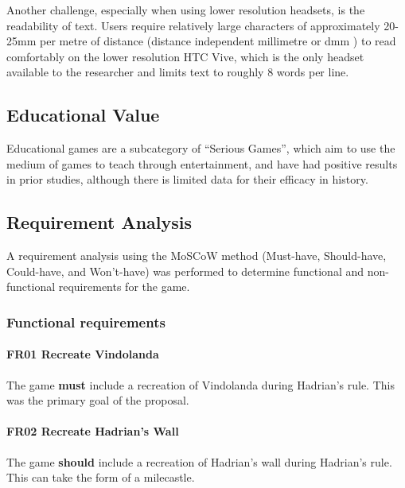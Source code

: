 \documentclass[sigconf,authordraft]{acmart}
\begin{document}
\label{sec:text_scale}
Another challenge, especially when using lower resolution headsets, is the
readability of text. Users require relatively large characters of approximately
20-25mm per metre of distance (distance independent millimetre or dmm
\cite{google_for_developers_designing_2017}) to read comfortably on the lower
resolution HTC Vive, \cite{solum_readability_2019} which is the only headset
available to the researcher and limits text to roughly 8 words per line.


\subsection{Educational Value}
Educational games are a subcategory of ``Serious Games'', which aim to use the
medium of games to teach through entertainment, and have had positive results in
prior studies, although there is limited data for their efficacy in history.
\cite{backlund_educational_2013}

\subsection{Requirement Analysis}

A requirement analysis using the MoSCoW method (Must-have, Should-have,
Could-have, and Won't-have) was performed to determine functional and
non-functional requirements for the game.

\subsubsection{Functional requirements}

\paragraph{FR01 Recreate Vindolanda}
The game \textbf{must} include a recreation of Vindolanda during Hadrian's
rule. This was the primary goal of the proposal.

\paragraph{FR02 Recreate Hadrian's Wall}
The game \textbf{should} include a recreation of Hadrian's wall during Hadrian's
rule. This can take the form of a milecastle.
\end{document}
